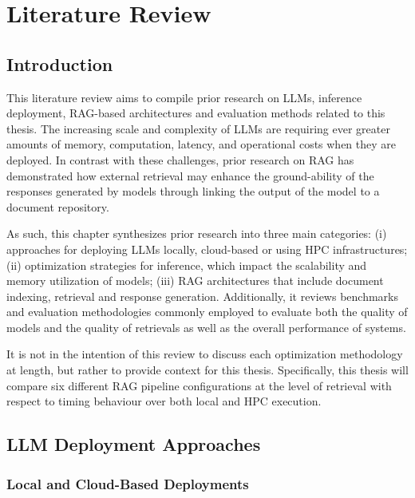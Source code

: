 \chapter{Literature Review}

\section{Introduction}

This literature review aims to compile prior research on \acp{LLM}, inference deployment, \ac{RAG}-based architectures and evaluation methods related to this thesis. The increasing scale and complexity of \acp{LLM} are requiring ever greater amounts of memory, computation, latency, and operational costs when they are deployed. In contrast with these challenges, prior research on \ac{RAG} has demonstrated how external retrieval may enhance the ground-ability of the responses generated by models through linking the output of the model to a document repository.

As such, this chapter synthesizes prior research into three main categories: (i) approaches for deploying \acp{LLM} locally, cloud-based or using \acf{HPC} infrastructures; (ii) optimization strategies for inference, which impact the scalability and memory utilization of models; (iii) \ac{RAG} architectures that include document indexing, retrieval and response generation. Additionally, it reviews benchmarks and evaluation methodologies commonly employed to evaluate both the quality of models and the quality of retrievals as well as the overall performance of systems.

It is not in the intention of this review to discuss each optimization methodology at length, but rather to provide context for this thesis. Specifically, this thesis will compare six different \ac{RAG} pipeline configurations at the level of retrieval with respect to timing behaviour over both local and \ac{HPC} execution.

\section{LLM Deployment Approaches}

\subsection{Local and Cloud-Based Deployments}

